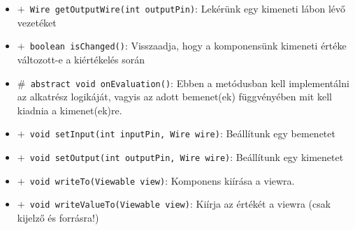 \begin{itemize}
\begin{itemize}
	\item[] \texttt{$+$ Wire getOutputWire(int outputPin)}: Lekérünk egy kimeneti lábon lévő vezetéket
	\item[] \texttt{$+$ boolean isChanged()}: Visszaadja, hogy a komponensünk kimeneti értéke változott-e a kiértékelés során
	\item[] \texttt{$\#$ abstract void onEvaluation()}: Ebben a metódusban kell implementálni az alkatrész logikáját, vagyis  az adott bemenet(ek) függvényében mit kell kiadnia a kimenet(ek)re.
	\item[] \texttt{$+$ void setInput(int inputPin, Wire wire)}: Beállítunk egy bemenetet
	\item[] \texttt{$+$ void setOutput(int outputPin, Wire wire)}: Beállítunk egy kimenetet
	\item[] \texttt{$+$ void writeTo(Viewable view)}: Komponens kiírása a viewra.
	\item[] \texttt{$+$ void writeValueTo(Viewable view)}: Kiírja az értékét a viewra (csak kijelző és forrásra!)
\end{itemize}
\end{itemize}

